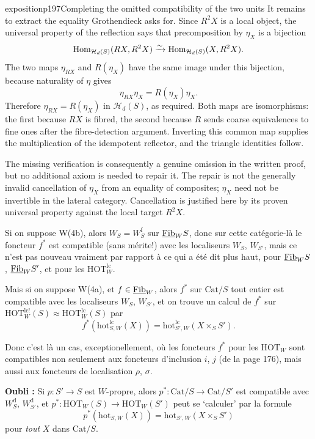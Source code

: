 \begin{dcomment}{exposition}{p197}{Completing the omitted compatibility of the two units}
It remains to extract the equality Grothendieck asks for. Since $R^2X$ is a local object, the universal property of the reflection says that precomposition by $\eta_X$ is a bijection
\[
 \mathrm{Hom}_{\mathcal H_d(S)}(RX,R^2X)
       \xrightarrow{\sim}
 \mathrm{Hom}_{\mathcal H_d(S)}(X,R^2X).
\]
The two maps $\eta_{RX}$ and $R(\eta_X)$ have the same image under this bijection, because naturality of $\eta$ gives
\[
 \eta_{RX}\eta_X=R(\eta_X)\eta_X.
\]
Therefore $\eta_{RX}=R(\eta_X)$ in $\mathcal H_d(S)$, as required. Both maps are isomorphisms: the first because $RX$ is fibred, the second because $R$ sends coarse equivalences to fine ones after the fibre-detection argument. Inverting this common map supplies the multiplication of the idempotent reflector, and the triangle identities follow.

The missing verification is consequently a genuine omission in the written proof, but no additional axiom is needed to repair it. The repair is not the generally invalid cancellation of $\eta_X$ from an equality of composites; $\eta_X$ need not be invertible in the lateral category. Cancellation is justified here by its proven universal property against the local target $R^2X$.
\end{dcomment}


Si on suppose W(4b), alors $W_S = W_S^{\mathrm{f}}$ sur $\underline{\mathrm{Fib}}_W S$, donc sur cette catégorie-là le foncteur $f^*$ est compatible (sans mérite!) avec les localiseurs $W_S$, $W_{S'}$, mais ce n'est pas nouveau vraiment
par rapport à ce qui a été dit plus haut, pour $\underline{\mathrm{Fib}}_W S$, $\underline{\mathrm{Fib}}_W S'$, et pour les $\mathrm{HOT}^{\mathrm{lc}}_W$.

Mais si on suppose W(4a), et $f \in \underline{\mathrm{Fib}}_W$, alors $f^*$ sur $\mathrm{Cat}/S$ tout entier est compatible avec les localiseurs $W_S$, $W_{S'}$, et on trouve un calcul de $f^*$ sur $\mathrm{HOT}^{\mathrm{lc!}}_W(S) \approx \mathrm{HOT}^{\mathrm{lc}}_W(S)$ par
\[
f^*(\mathrm{hot}^{\mathrm{lc}}_{S,W}(X)) = \mathrm{hot}^{\mathrm{lc}}_{S',W}(X \times_S S').
\]

Donc c'est là un cas, exceptionellement, où les foncteurs $f^*$ pour les $\mathrm{HOT}_W$ sont compatibles non seulement aux foncteurs d'inclusion $i$, $j$ (de la page 176), mais aussi aux foncteurs de localisation $\rho$, $\sigma$. %

\textbf{Oubli :} Si $p : S' \longrightarrow S$ est $W$-propre, alors $p^* : \mathrm{Cat}/S \longrightarrow \mathrm{Cat}/S'$ est compatible avec $W_S^{\mathrm{d}}$, $W_{S'}^{\mathrm{d}}$, et $p^* : \mathrm{HOT}_W(S) \longrightarrow \mathrm{HOT}_W(S')$ peut se ‘calculer’ par la formule
\[
p^*(\mathrm{hot}_{S,W}(X)) = \mathrm{hot}_{S',W}(X \times_S S')
\]
pour \textit{tout} $X$ dans $\mathrm{Cat}/S$.

